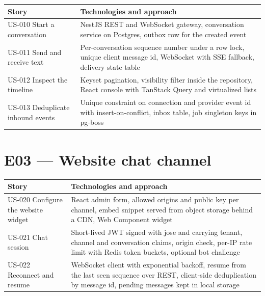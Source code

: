 {\small
\begin{longtable}{@{}>{\raggedright\arraybackslash}p{}>{\raggedright\arraybackslash}p{}@{}}
\toprule
\textbf{Story} & \textbf{Technologies and approach} \\
\midrule
\endhead
\bottomrule
\endfoot
US-010 Start a conversation & NestJS REST and WebSocket gateway, conversation service on Postgres, outbox row for the created event \\
US-011 Send and receive text & Per-conversation sequence number under a row lock, unique client message id, WebSocket with SSE fallback, delivery state table \\
US-012 Inspect the timeline & Keyset pagination, visibility filter inside the repository, React console with TanStack Query and virtualized lists \\
US-013 Deduplicate inbound events & Unique constraint on connection and provider event id with insert-on-conflict, inbox table, job singleton keys in pg-boss \\
\end{longtable}
}

\section{E03 --- Website chat channel}

{\small
\begin{longtable}{@{}>{\raggedright\arraybackslash}p{}>{\raggedright\arraybackslash}p{}@{}}
\toprule
\textbf{Story} & \textbf{Technologies and approach} \\
\midrule
\endhead
\bottomrule
\endfoot
US-020 Configure the website widget & React admin form, allowed origins and public key per channel, embed snippet served from object storage behind a CDN, Web Component widget \\
US-021 Chat session & Short-lived JWT signed with jose and carrying tenant, channel and conversation claims, origin check, per-IP rate limit with Redis token buckets, optional bot challenge \\
US-022 Reconnect and resume & WebSocket client with exponential backoff, resume from the last seen sequence over REST, client-side deduplication by message id, pending messages kept in local storage \\
\end{longtable}
}

